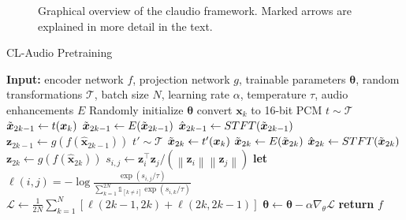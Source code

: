 \begin{figure}[!h]
    \centering
    \scalebox{1.25}{}
    \caption[Contrastive learning for Audio]{Graphical overview of the \gls{claudio} framework. Marked arrows are explained in more detail in the text.}
    \label{fig:claudio}
\end{figure}

\begin{algorithm}
    \caption{CL-Audio Pretraining}
    \label{alg:claudio_pretraining}
    
    \begin{algorithmic}[1]
        \State \textbf{Input:} encoder network $f$, projection network $g$, trainable parameters $\boldsymbol{\theta}$, random transformations $\mathcal{T}$, batch size $N$, learning rate $\alpha$, temperature $\tau$, audio enhancements $E$
        \State Randomly initialize $\boldsymbol{\theta}$
                    \State convert $\boldsymbol{x}_{k}$ to 16-bit PCM
                    \State $t \sim \mathcal{T}$ 
                    \State $\Tilde{\boldsymbol{x}}_{2k-1} \gets t(\boldsymbol{x}_k)$
                    \State $\Tilde{\boldsymbol{x}}_{2k-1} \gets E(\Tilde{\boldsymbol{x}}_{2k-1})$ 
                    \State $\hat{\boldsymbol{x}}_{2k-1} \gets STFT(\Tilde{\boldsymbol{x}}_{2k-1})$
                    \State $\boldsymbol{z}_{2k-1} \gets g(f(\hat{\boldsymbol{x}}_{2k-1}))$
                    \State $t' \sim \mathcal{T}$ 
                    \State $\Tilde{\boldsymbol{x}}_{2k} \gets t'(\boldsymbol{x}_k)$
                    \State $\Tilde{\boldsymbol{x}}_{2k} \gets E(\Tilde{\boldsymbol{x}}_{2k})$ 
                    \State $\hat{\boldsymbol{x}}_{2k} \gets STFT(\Tilde{\boldsymbol{x}}_{2k})$
                    \State $\boldsymbol{z}_{2k} \gets g(f(\hat{\boldsymbol{x}}_{2k}))$
                \EndFor
                    \State $s_{i,j} \gets \boldsymbol{z}^\intercal_i \boldsymbol{z}_j / (\left\lVert\boldsymbol{z}_i\right\rVert \left\lVert\boldsymbol{z}_j\right\rVert)$ 
                \EndFor
            \EndFor
            \State \textbf{let} $\ell(i,j) = -\log \tfrac{\exp(s_{i,j}/\tau)}{\sum_{k=1}^{2N} \mathbb{1}_{[k \neq i]} \exp(s_{i,k} / \tau)}$ 
            \State $\mathcal{L} \gets \tfrac{1}{2N} \sum_{k=1}^{N} [\ell(2k-1,2k) + \ell(2k,2k-1)]$
            \State $\boldsymbol{\theta} \gets \boldsymbol{\theta} - \alpha \nabla_\theta \mathcal{L}$
        \EndWhile
        \State \textbf{return} $f$ 
    \end{algorithmic}
\end{algorithm}

